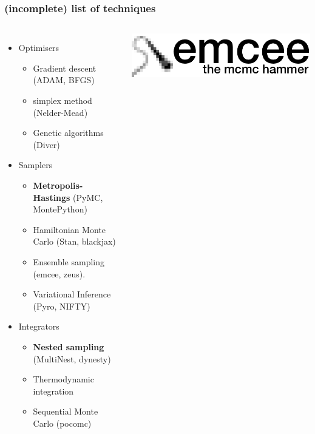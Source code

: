 \documentclass[aspectratio=169]{beamer}
\begin{document}
\begin{frame}
    \frametitle{(incomplete) list of techniques}
    \begin{columns}
        \begin{itemize}
            \item Optimisers
                \begin{itemize}
                    \item Gradient descent (ADAM, BFGS)
                    \item simplex method (Nelder-Mead)
                    \item Genetic algorithms (Diver)
                \end{itemize}
            \item Samplers
                \begin{itemize}
                    \item \textbf{Metropolis-Hastings} (PyMC, MontePython)
                    \item Hamiltonian Monte Carlo (Stan, blackjax)
                    \item Ensemble sampling (emcee, zeus). 
                    \item Variational Inference (Pyro, NIFTY)
                \end{itemize}
            \item Integrators
                \begin{itemize}
                    \item \textbf{Nested sampling} (MultiNest, dynesty)
                    \item Thermodynamic integration
                    \item Sequential Monte Carlo (pocomc)
                \end{itemize}
            \end{itemize}
        \begin{columns}
        \includegraphics[width=\textwidth]{figures/emcee}

\end{columns}
\end{columns}
\end{frame}
\end{document}
